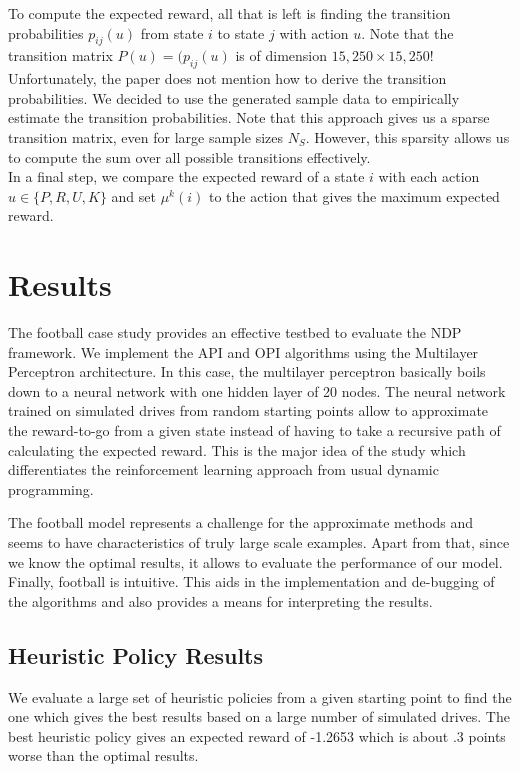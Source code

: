 \documentclass[11pt, oneside]{article}   	%
\begin{document}
To compute the expected reward, all that is left is finding the transition probabilities $p_{ij}(u)$ from state $i$ to state $j$ with action $u$. Note that the transition matrix $P(u) = (p_{ij}(u)$ is of dimension $15,250 \times 15,250$! Unfortunately, the paper does not mention how to derive the transition probabilities. We decided to use the generated sample data to empirically estimate the transition probabilities. Note that this approach gives us a sparse transition matrix, even for large sample sizes $N_S$. However, this sparsity allows us to compute the sum over all possible transitions effectively. \\

In a final step, we compare the expected reward of a state $i$ with each action $u \in \{P, R, U, K\}$ and set $\mu^k(i)$ to the action that gives the maximum expected reward.

\section{Results}

The football case study provides an effective testbed to evaluate the NDP framework. We implement the API and OPI algorithms using the Multilayer Perceptron architecture. In this case, the multilayer perceptron basically boils down to a neural network with one hidden layer of 20 nodes.
The neural network trained on simulated drives from random starting points allow to approximate the reward-to-go from a given state instead of having to take a recursive path of calculating the expected reward. This is the major idea of the study which differentiates the reinforcement learning approach from usual dynamic programming.

The football model represents a challenge for the approximate methods and seems to have characteristics of truly large scale examples. Apart from that, since we know the optimal results, it allows to evaluate the performance of our model. Finally, football is intuitive. This aids in the implementation and de-bugging of the algorithms and also provides a means for interpreting the results.

\subsection{Heuristic Policy Results}
We evaluate a large set of heuristic policies from a given starting point to find the one which gives the best results based on a large number of simulated drives. The best heuristic policy gives an expected reward of -1.2653 which is about .3 points worse than the optimal results.
\end{document}
